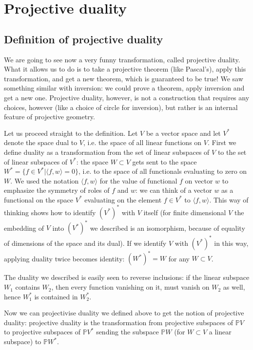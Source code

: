 \chapter{Projective duality}

\section{Definition of projective duality}

We are going to see now a very funny transformation, called projective duality. What it allows us to do is to take a projective theorem (like Pascal's), apply this transformation, and get a new theorem, which is guaranteed to be true! We saw something similar with inversion: we could prove a theorem, apply inversion and get a new one. Projective duality, however, is not a construction that requires any choices, however (like a choice of circle for inversion), but rather is an internal feature of projective geometry.

Let us proceed straight to the definition. Let $V$ be a vector space and let $V^*$ denote the space dual to $V$, i.e. the space of all linear functions on $V$. First we define duality as a transformation from the set of linear subspaces of $V$ to the set of linear subspaces of $V^*$: the space $W\subset V$ gets sent to the space $W^*=\{f\in V^*| \langle f,w \rangle =0\}$, i.e. to the space of all functionals evaluating to zero on $W$. We used the notation $\langle f,w \rangle$ for the value of functional $f$ on vector $w$ to emphasize the symmetry of roles of $f$ and $w$: we can think of a vector $w$ as a functional on the space $V^*$ evaluating on the element $f\in V^*$ to $\langle f, w \rangle$. This way of thinking shows how to identify $(V^*)^*$ with $V$ itself (for finite dimensional $V$ the embedding of $V$ into $(V^*)^*$ we described is an isomorphism, because of equality of dimensions of the space and its dual). If we identify $V$ with $(V^*)^*$ in this way, applying duality twice becomes identity: $(W^*)^*=W$ for any $W\subset V$.

The duality we described is easily seen to reverse inclusions: if the linear subspace $W_1$ contains $W_2$, then every function vanishing on it, must vanish on $W_2$ as well, hence $W_1^*$ is contained in $W_2^*$.

Now we can projectivise duality we defined above to get the notion of projective duality: projective duality is the transformation from projective subspaces of $\mathbb{P} V$ to projective subspaces of $\mathbb{P}V^*$ sending the subspace $\mathbb{P}W$ (for $W\subset V$ a linear subspace) to $\mathbb{P}W^*$.

